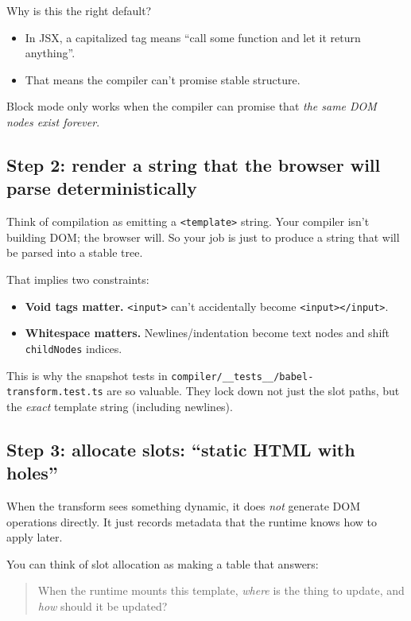 Why is this the right default?

\begin{itemize}
\item In JSX, a capitalized tag means ``call some function and let it return anything''.
\item That means the compiler can't promise stable structure.
\end{itemize}

Block mode only works when the compiler can promise that \emph{the same DOM nodes exist forever}.

\subsection{Step 2: render a string that the browser will parse deterministically}

Think of compilation as emitting a \texttt{<template>} string.
Your compiler isn't building DOM; the browser will.
So your job is just to produce a string that will be parsed into a stable tree.

That implies two constraints:

\begin{itemize}
\item \textbf{Void tags matter.} \texttt{<input>} can't accidentally become \texttt{<input></input>}.
\item \textbf{Whitespace matters.} Newlines/indentation become text nodes and shift \texttt{childNodes} indices.
\end{itemize}

This is why the snapshot tests in \texttt{compiler/\_\_tests\_\_/babel-transform.test.ts} are so valuable.
They lock down not just the slot paths, but the \emph{exact} template string (including newlines).

\subsection{Step 3: allocate slots: ``static HTML with holes''}

When the transform sees something dynamic, it does \emph{not} generate DOM operations directly.
It just records metadata that the runtime knows how to apply later.

You can think of slot allocation as making a table that answers:

\begin{quote}
When the runtime mounts this template, \emph{where} is the thing to update, and \emph{how} should it be updated?
\end{quote}

